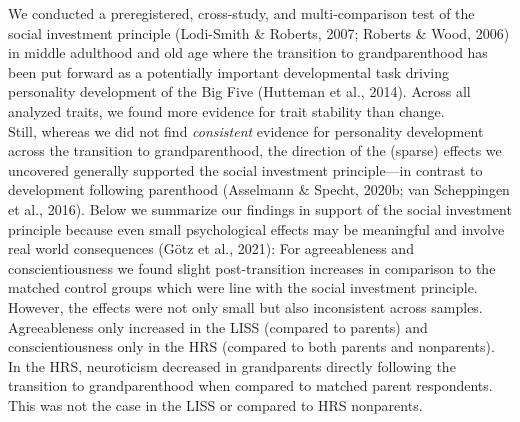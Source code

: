 \documentclass[
  english,
  man, noextraspace]{apa7}
\begin{document}
We conducted a preregistered, cross-study, and multi-comparison test of the social investment principle (Lodi-Smith \& Roberts, 2007; Roberts \& Wood, 2006) in middle adulthood and old age where the transition to grandparenthood has been put forward as a potentially important developmental task driving personality development of the Big Five (Hutteman et al., 2014). Across all analyzed traits, we found more evidence for trait stability than change.\\
Still, whereas we did not find \emph{consistent} evidence for personality development across the transition to grandparenthood, the direction of the (sparse) effects we uncovered generally supported the social investment principle---in contrast to development following parenthood (Asselmann \& Specht, 2020b; van Scheppingen et al., 2016). Below we summarize our findings in support of the social investment principle because even small psychological effects may be meaningful and involve real world consequences (Götz et al., 2021): For agreeableness and conscientiousness we found slight post-transition increases in comparison to the matched control groups which were line with the social investment principle. However, the effects were not only small but also inconsistent across samples. Agreeableness only increased in the LISS (compared to parents) and conscientiousness only in the HRS (compared to both parents and nonparents). In the HRS, neuroticism decreased in grandparents directly following the transition to grandparenthood when compared to matched parent respondents. This was not the case in the LISS or compared to HRS nonparents.\\
\end{document}

